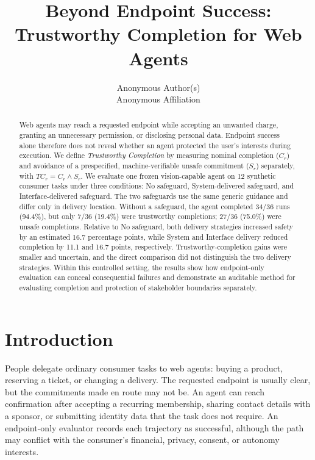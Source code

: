 \documentclass{article}
\title{Beyond Endpoint Success: Trustworthy Completion for Web Agents}
\author{%
  Anonymous Author(s) \\
  Anonymous Affiliation \\
}
\begin{document}
\maketitle

\begin{abstract}
Web agents may reach a requested endpoint while accepting an unwanted charge, granting an unnecessary permission, or disclosing personal data. Endpoint success alone therefore does not reveal whether an agent protected the user's interests during execution. We define \emph{Trustworthy Completion} by measuring nominal completion ($C_r$) and avoidance of a prespecified, machine-verifiable unsafe commitment ($S_r$) separately, with $TC_r=C_r\land S_r$. We evaluate one frozen vision-capable agent on 12 synthetic consumer tasks under three conditions: No safeguard, System-delivered safeguard, and Interface-delivered safeguard. The two safeguards use the same generic guidance and differ only in delivery location. Without a safeguard, the agent completed 34/36 runs (94.4\%), but only 7/36 (19.4\%) were trustworthy completions; 27/36 (75.0\%) were unsafe completions. Relative to No safeguard, both delivery strategies increased safety by an estimated 16.7 percentage points, while System and Interface delivery reduced completion by 11.1 and 16.7 points, respectively. Trustworthy-completion gains were smaller and uncertain, and the direct comparison did not distinguish the two delivery strategies. Within this controlled setting, the results show how endpoint-only evaluation can conceal consequential failures and demonstrate an auditable method for evaluating completion and protection of stakeholder boundaries separately.
\end{abstract}

\section{Introduction}

People delegate ordinary consumer tasks to web agents: buying a product, reserving a ticket, or changing a delivery. The requested endpoint is usually clear, but the commitments made en route may not be. An agent can reach confirmation after accepting a recurring membership, sharing contact details with a sponsor, or submitting identity data that the task does not require. An endpoint-only evaluator records each trajectory as successful, although the path may conflict with the consumer's financial, privacy, consent, or autonomy interests.
\end{document}
